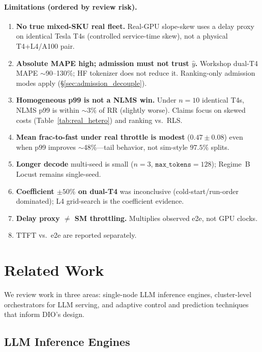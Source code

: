 \documentclass[10pt,twocolumn,letterpaper]{article}
\begin{document}
\paragraph{Limitations (ordered by review risk).}
\label{sec:threats}
\begin{enumerate}
\item \textbf{No true mixed-SKU real fleet.} Real-GPU slope-skew uses a delay proxy on identical Tesla T4s (controlled service-time skew), not a physical T4+L4/A100 pair.
\item \textbf{Absolute MAPE high; admission must not trust $\hat{y}$.} Workshop dual-T4 MAPE $\sim$90--130\%; HF tokenizer does not reduce it. Ranking-only admission modes apply (\S\ref{sec:admission_decouple}).
\item \textbf{Homogeneous p99 is not a NLMS win.} Under $n{=}10$ identical T4s, NLMS p99 is within $\sim$3\% of RR (slightly worse). Claims focus on skewed costs (Table~\ref{tab:real_hetero}) and ranking vs.\ RLS.
\item \textbf{Mean frac-to-fast under real throttle is modest} ($0.47\pm0.08$) even when p99 improves $\sim$48\%---tail behavior, not sim-style $97.5\%$ splits.
\item \textbf{Longer decode} multi-seed is small ($n{=}3$, $\texttt{max\_tokens}{=}128$); Regime~B Locust remains single-seed.
\item \textbf{Coefficient $\pm50\%$ on dual-T4} was inconclusive (cold-start/run-order dominated); L4 grid-search is the coefficient evidence.
\item \textbf{Delay proxy $\neq$ SM throttling.} Multiplies observed e2e, not GPU clocks.
\item TTFT vs.\ e2e are reported separately.
\end{enumerate}


\section{Related Work}
\label{sec:related}

We review work in three areas: single-node LLM inference engines, cluster-level orchestrators for LLM serving, and adaptive control and prediction techniques that inform DIO's design.

\subsection{LLM Inference Engines}
\end{document}
